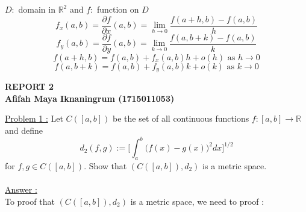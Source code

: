 \documentclass[a4paper,10pt]{article}
\newcommand{\R}{\mathbb{R}}
\begin{document}
$ D : $ domain in $ \R^2 $ and $ f : $ function on $ D $
\[ f_{x}(a,b) = \dfrac{\partial f}{\partial x} (a,b) = \lim\limits_{h\rightarrow 0} \dfrac{f(a+h,b)-f(a,b)}{h} \]
\[ f_{y}(a,b) = \dfrac{\partial f}{\partial y} (a,b) = \lim\limits_{k\rightarrow 0} \dfrac{f(a,b+k)-f(a,b)}{k} \]
\[ f(a+h,b) = f(a,b) +f_{x}(a,b)h + o(h) \text{ as } h\rightarrow 0 \]
\[ f(a,b+k) = f(a,b) +f_{y}(a,b)k + o(k) \text{ as } k\rightarrow 0 \]

\newpage
\textbf{REPORT 2 \\ Afifah Maya Iknaningrum (1715011053)}

\underline{Problem 1 :} Let $ C([a,b]) $ be the set of all continuous functions $ f : [a,b] \rightarrow \R $ and define
\[ d_{2}(f,g) := \Big[ \int_{a}^{b} \big( f(x)-g(x) \big)^{2} dx  \Big]^{1/2} \]
for $ f,g \in C([a,b]) $. Show that $ (C([a,b]),d_{2}) $ is a metric space.\\ \\
\underline{Answer :}\\
To proof that $ (C([a,b]),d_{2}) $ is a metric space, we need to proof :
\end{document}
